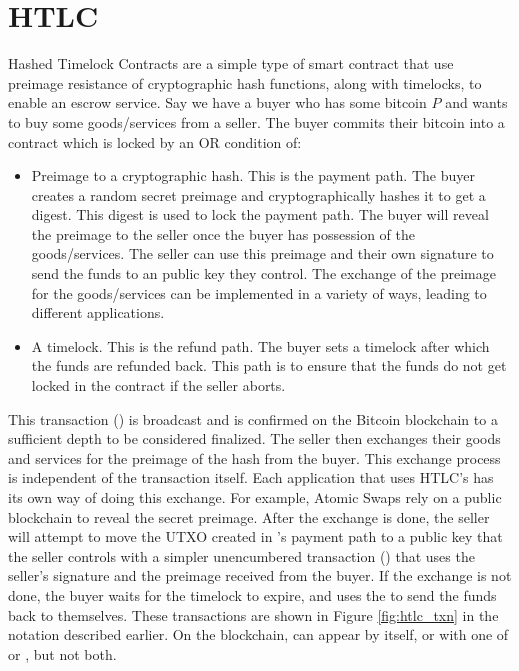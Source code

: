\section{HTLC}
Hashed Timelock Contracts are a simple type of smart contract that use preimage resistance of cryptographic hash functions, along with timelocks, to enable an escrow service. Say we have a buyer who has some bitcoin $P$ and wants to buy some goods/services from a seller. The buyer commits their bitcoin into a contract which is locked by an OR condition of:
\begin{itemize}
    \item Preimage to a cryptographic hash. This is the payment path. The buyer creates a random secret preimage and cryptographically hashes it to get a digest. This digest is used to lock the payment path. The buyer will reveal the preimage to the seller once the buyer has possession of the goods/services. The seller can use this preimage and their own signature to send the funds to an public key they control. The exchange of the preimage for the goods/services can be implemented in a variety of ways, leading to different applications.
    \item A timelock. This is the refund path. The buyer sets a timelock after which the funds are refunded back. This path is to ensure that the funds do not get locked in the contract if the seller aborts. 
\end{itemize}

This transaction (\htlctxn{}) is broadcast and is confirmed on the Bitcoin blockchain to a sufficient depth to be considered finalized. The seller then exchanges their goods and services for the preimage of the hash from the buyer. This exchange process is independent of the transaction itself. Each application that uses HTLC's has its own way of doing this exchange. For example, Atomic Swaps rely on a public blockchain to reveal the secret preimage. After the exchange is done, the seller will attempt to move the UTXO created in \htlctxn{}'s payment path to a public key that the seller controls with a simpler unencumbered transaction (\sellertxn{}) that uses the seller's signature and the preimage received from the buyer. If the exchange is not done, the buyer waits for the timelock to expire, and uses the  to send the funds back to themselves. These transactions are shown in Figure \ref{fig:htlc_txn} in the notation described earlier. On the blockchain, \htlctxn{} can appear by itself, or with one of \sellertxn{} or , but not both.

